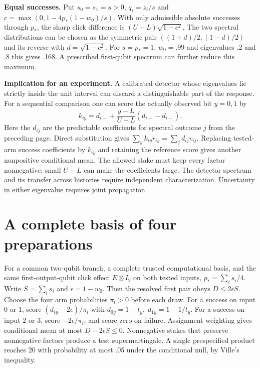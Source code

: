 \documentclass[
  10pt,
  a4paper,
]{article}
\begin{document}
\textbf{Equal successes.} Put \(s_0=s_1=s>0\), \(q_i=z_i/s\) and \(c=\max(0,1-4p_*(1-w_0)/s)\). With only admissible absolute successes through \(p_*\), the sharp click difference is \((U-L)\sqrt{1-c^2}\). The two spectral distributions can be chosen as the symmetric pair \(((1+d)/2,(1-d)/2)\) and its reverse with \(d=\sqrt{1-c^2}\). For \(s=p_*=1\), \(w_0=.99\) and eigenvalues .2 and .8 this gives .168. A prescribed first-qubit spectrum can further reduce this maximum.

\textbf{Implication for an experiment.} A calibrated detector whose eigenvalues lie strictly inside the unit interval can discard a distinguishable part of the response. For a sequential comparison one can score the actually observed bit \(y=0,1\) by \[
 k_{iy}=d_{i-}+\frac{y-L}{U-L}(d_{i+}-d_{i-}).
\] Here the \(d_{ij}\) are the predictable coefficients for spectral outcome \(j\) from the preceding page. Direct substitution gives \(\sum_y k_{iy}r_{iy}=\sum_j d_{ij}v_{ij}\). Replacing tested-arm success coefficients by \(k_{iy}\) and retaining the reference score gives another nonpositive conditional mean. The allowed stake must keep every factor nonnegative; small \(U-L\) can make the coefficients large. The detector spectrum and its transfer across histories require independent characterization. Uncertainty in either eigenvalue requires joint propagation.

\newpage

\section{A complete basis of four preparations}\label{a-complete-basis-of-four-preparations}

For a common two-qubit branch, a complete trusted computational basis, and the same first-output-qubit click effect \(E\otimes I_2\) on both tested inputs, \(p_*=\sum_i s_i/4\). Write \(S=\sum_i s_i\) and \(\epsilon=1-w_0\). Then the resolved first pair obeys \(D\le2\epsilon S\). Choose the four arm probabilities \(\pi_i>0\) before each draw. For a success on input 0 or 1, score \((d_{iy}-2\epsilon)/\pi_i\) with \(d_{0y}=1-t_y,\;d_{1y}=1-1/t_y\). For a success on input 2 or 3, score \(-2\epsilon/\pi_i\), and score zero on failure. Assignment weighting gives conditional mean at most \(D-2\epsilon S\le0\). Nonnegative stakes that preserve nonnegative factors produce a test supermartingale. A single prespecified product reaches 20 with probability at most .05 under the conditional null, by Ville's inequality.
\end{document}
